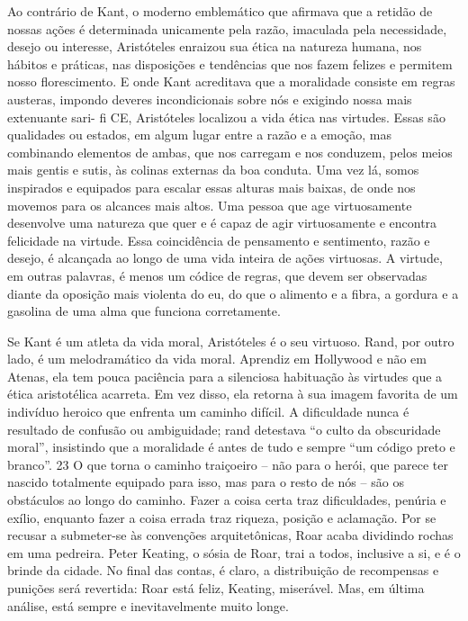 Ao contrário de Kant, o moderno emblemático que afirmava que a retidão de nossas ações é determinada unicamente pela razão, imaculada pela necessidade, desejo ou interesse, Aristóteles enraizou sua ética na natureza humana, nos hábitos e práticas, nas disposições e tendências que nos fazem felizes e permitem nosso florescimento. E onde Kant acreditava que a moralidade consiste em regras austeras, impondo deveres incondicionais sobre nós e exigindo nossa mais extenuante sari- fi CE, Aristóteles localizou a vida ética nas virtudes. Essas são qualidades ou estados, em algum lugar entre a razão e a emoção, mas combinando elementos de ambas, que nos carregam e nos conduzem, pelos meios mais gentis e sutis, às colinas externas da boa conduta. Uma vez lá, somos inspirados e equipados para escalar essas alturas mais baixas, de onde nos movemos para os alcances mais altos. Uma pessoa que age virtuosamente desenvolve uma natureza que quer e é capaz de agir virtuosamente e encontra felicidade na virtude. Essa coincidência de pensamento e sentimento, razão e desejo, é alcançada ao longo de uma vida inteira de ações virtuosas. A virtude, em outras palavras, é menos um códice de regras, que devem ser observadas diante da oposição mais violenta do eu, do que o alimento e a fibra, a gordura e a gasolina de uma alma que funciona corretamente.
 
\par
 
Se Kant é um atleta da vida moral, Aristóteles é o seu virtuoso. Rand, por outro lado, é um melodramático da vida moral. Aprendiz em Hollywood e não em Atenas, ela tem pouca paciência para a silenciosa habituação às virtudes que a ética aristotélica acarreta. Em vez disso, ela retorna à sua imagem favorita de um indivíduo heroico que enfrenta um caminho difícil. A dificuldade nunca é resultado de confusão ou ambiguidade; rand detestava “o culto da obscuridade moral”, insistindo que a moralidade é antes de tudo e sempre “um código preto e branco”.
 {\color{blue} 23}  
O que torna o caminho traiçoeiro – não para o herói, que parece ter nascido totalmente equipado para isso, mas para o resto de nós – são os obstáculos ao longo do caminho. Fazer a coisa certa traz dificuldades, penúria e exílio, enquanto fazer a coisa errada traz riqueza, posição e aclamação. Por se recusar a submeter-se às convenções arquitetônicas, Roar acaba dividindo rochas em uma pedreira. Peter Keating, o sósia de Roar, trai a todos, inclusive a si, e é o brinde da cidade. No final das contas, é claro, a distribuição de recompensas e punições será revertida: Roar está feliz, Keating, miserável. Mas, em última análise, está sempre e inevitavelmente muito longe.
 
